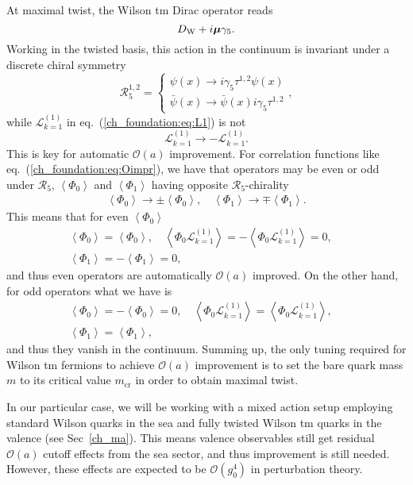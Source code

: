 At maximal twist, the Wilson tm Dirac operator reads
\begin{equation}
D_{\textrm W}+i\boldsymbol{\mu}\gamma_5.
\end{equation}
Working in the twisted basis, this action in the continuum is invariant under a discrete chiral symmetry 
\begin{equation}
\mathcal{R}_5^{1,2}=\left\{\begin{matrix}
\psi(x)\rightarrow i\gamma_5\tau^{1,2}\psi(x) \\ 
\bar{\psi}(x)\rightarrow \bar{\psi}(x)i\gamma_5\tau^{1,2}
\end{matrix}\right.,
\end{equation}
while $\mathcal{L}_{k=1}^{(1)}$ in eq.~(\ref{ch_foundation:eq:L1}) is not 
\begin{equation}
\mathcal{L}_{k=1}^{(1)}\rightarrow-\mathcal{L}_{k=1}^{(1)}.
\end{equation}
This is key for automatic $\mathcal{O}(a)$ improvement. For correlation functions like eq.~(\ref{ch_foundation:eq:Oimpr}), we have that operators may be even or odd under $\mathcal{R}_5$, $\left<\Phi_0\right>$ and $\left<\Phi_1\right>$ having opposite $\mathcal{R}_5$-chirality
\begin{gather}
\left<\Phi_0\right>\rightarrow\pm\left<\Phi_0\right>, \quad \left<\Phi_1\right>\rightarrow\mp\left<\Phi_1\right>.
\end{gather}
This means that for even $\left<\Phi_0\right>$
\begin{gather}
\left<\Phi_0\right>=\left<\Phi_0\right>,
\quad \left<\Phi_0\mathcal{L}^{(1)}_{k=1}\right>=-\left<\Phi_0\mathcal{L}^{(1)}_{k=1}\right>=0, \quad \\ \left<\Phi_1\right>=-\left<\Phi_1\right>=0,
\end{gather}
and thus even operators are automatically $\mathcal{O}(a)$ improved. On the other hand, for odd operators what we have is
\begin{gather}
\left<\Phi_0\right>=-\left<\Phi_0\right>=0, \quad
\left<\Phi_0\mathcal{L}^{(1)}_{k=1}\right>=\left<\Phi_0\mathcal{L}^{(1)}_{k=1}\right>, \quad \\ \left<\Phi_1\right>=\left<\Phi_1\right>,
\end{gather}
and thus they vanish in the continuum. Summing up, the only tuning required for Wilson tm fermions to achieve $\mathcal{O}(a)$ improvement is to set the bare quark mass $m$ to its critical value $m_{\textrm{cr}}$ in order to obtain maximal twist.

In our particular case, we will be working with a mixed action setup employing standard Wilson quarks in the sea and fully twisted Wilson tm quarks in the valence (see Sec~\ref{ch_ma}). This means valence observables still get residual $\mathcal{O}(a)$ cutoff effects from the sea sector, and thus improvement is still needed. However, these effects are expected to be $\mathcal{O}(g_0^4)$ in perturbation theory.

